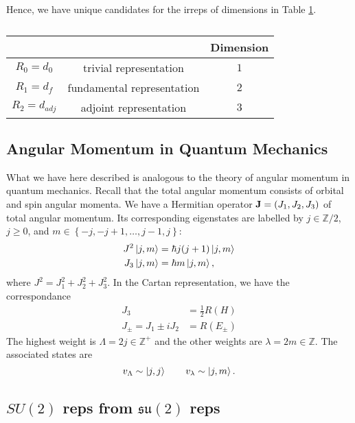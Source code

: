 Hence, we have unique candidates for the irreps of dimensions in Table \ref{tab:12-reps}.
\begin{table}[htpb]
  \centering
  \begin{tabular}{|c|c|c|}
    \hline
     & & Dimension \\
     \hline
    $R_0 = d_0$ & trivial representation & $1$  \\
    $R_1 = d_f$ & fundamental representation & $2$ \\
    $R_2 = d_{adj}$ & adjoint representation & $3$ \\
    \hline
  \end{tabular}
  \caption{}
  \label{tab:12-reps}
\end{table}

\subsection{Angular Momentum in Quantum Mechanics}%
\label{sub:angular_momentum_in_quantum_mechanics}

What we have here described is analogous to the theory of angular momentum in quantum mechanics.
Recall that the total angular momentum consists of orbital and spin angular momenta.
We have a Hermitian operator $\vb{J} = (J_1, J_2, J_3)$ of total angular momentum.
Its corresponding eigenstates are labelled by $j \in \mathbb{Z}/2$, $j \geq 0$, and $m \in \left\{ -j, -j + 1, \dots, j-1, j \right\}$:
\begin{align}
  J^2 \ket{j, m} &= \hbar j (j+1) \ket{j, m}  \\
  J_3 \ket{j, m} &= \hbar m \ket{j, m},
\end{align}
where $J^2 = J_1^2 + J_2^2 + J_3^2$.
In the Cartan representation, we have the correspondance
\begin{align}
  J_3 &= \frac{1}{2} R(H) \\
  J_\pm = J_1 \pm i J_2 &= R(E_\pm)
\end{align}
The highest weight is $\Lambda = 2 j \in \mathbb{Z}^+$ and the other weights are $\lambda = 2m \in \mathbb{Z}$. The associated states are
\begin{equation}
  v_\Lambda \sim \ket{j, j} \qquad v_\lambda \sim \ket{j, m}.
\end{equation}

\subsection{\texorpdfstring{$SU(2)$}{SU(2)} reps from \texorpdfstring{$\mathfrak{su}(2)$}{its Lie algebra's} reps}%
\label{sub:su2-reps-from-lsu2-reps}

